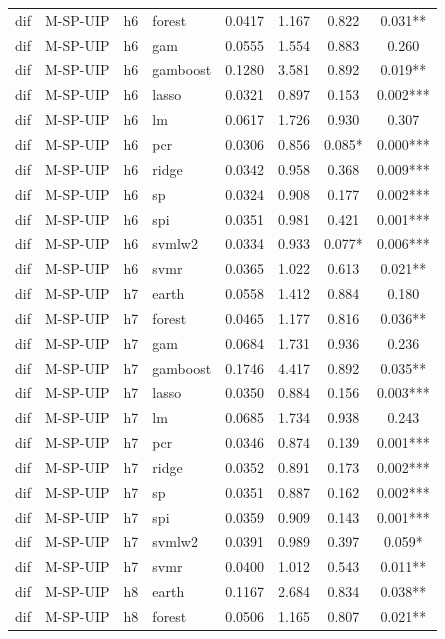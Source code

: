 \begin{ThreePartTable}
\begin{longtable}[t]{llclcccc}
dif & M-SP-UIP & h6 & forest & 0.0417 & 1.167 & 0.822 & 0.031**\\
dif & M-SP-UIP & h6 & gam & 0.0555 & 1.554 & 0.883 & 0.260\\
dif & M-SP-UIP & h6 & gamboost & 0.1280 & 3.581 & 0.892 & 0.019**\\
dif & M-SP-UIP & h6 & lasso & 0.0321 & 0.897 & 0.153 & 0.002***\\
dif & M-SP-UIP & h6 & lm & 0.0617 & 1.726 & 0.930 & 0.307\\
dif & M-SP-UIP & h6 & pcr & 0.0306 & 0.856 & 0.085* & 0.000***\\
dif & M-SP-UIP & h6 & ridge & 0.0342 & 0.958 & 0.368 & 0.009***\\
dif & M-SP-UIP & h6 & sp & 0.0324 & 0.908 & 0.177 & 0.002***\\
dif & M-SP-UIP & h6 & spi & 0.0351 & 0.981 & 0.421 & 0.001***\\
dif & M-SP-UIP & h6 & svmlw2 & 0.0334 & 0.933 & 0.077* & 0.006***\\
dif & M-SP-UIP & h6 & svmr & 0.0365 & 1.022 & 0.613 & 0.021**\\
\addlinespace
dif & M-SP-UIP & h7 & earth & 0.0558 & 1.412 & 0.884 & 0.180\\
dif & M-SP-UIP & h7 & forest & 0.0465 & 1.177 & 0.816 & 0.036**\\
dif & M-SP-UIP & h7 & gam & 0.0684 & 1.731 & 0.936 & 0.236\\
dif & M-SP-UIP & h7 & gamboost & 0.1746 & 4.417 & 0.892 & 0.035**\\
dif & M-SP-UIP & h7 & lasso & 0.0350 & 0.884 & 0.156 & 0.003***\\
dif & M-SP-UIP & h7 & lm & 0.0685 & 1.734 & 0.938 & 0.243\\
dif & M-SP-UIP & h7 & pcr & 0.0346 & 0.874 & 0.139 & 0.001***\\
dif & M-SP-UIP & h7 & ridge & 0.0352 & 0.891 & 0.173 & 0.002***\\
dif & M-SP-UIP & h7 & sp & 0.0351 & 0.887 & 0.162 & 0.002***\\
dif & M-SP-UIP & h7 & spi & 0.0359 & 0.909 & 0.143 & 0.001***\\
dif & M-SP-UIP & h7 & svmlw2 & 0.0391 & 0.989 & 0.397 & 0.059*\\
dif & M-SP-UIP & h7 & svmr & 0.0400 & 1.012 & 0.543 & 0.011**\\
\addlinespace
dif & M-SP-UIP & h8 & earth & 0.1167 & 2.684 & 0.834 & 0.038**\\
dif & M-SP-UIP & h8 & forest & 0.0506 & 1.165 & 0.807 & 0.021**\\

\end{longtable}
\end{ThreePartTable}
